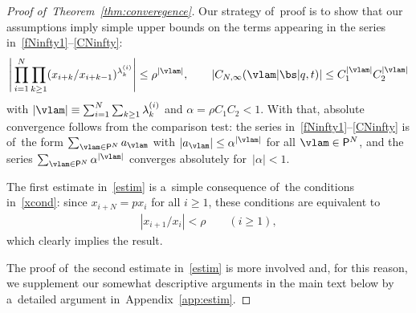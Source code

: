 \begin{proof}[Proof of~Theorem~\ref{thm:converegence}]
Our strategy of~proof is to show that our assumptions imply simple upper bounds on the terms appearing in the series in~\eqref{fNinfty1}--\eqref{CNinfty}:
\begin{gather}
\label{estim}
\Bigg|\prod_{i=1}^N\prod_{k\geq 1}(x_{i+k}/x_{i+k-1})^{\lambda^{(i)}_k}\Bigg|\leq \rho^{|\vlam|},\qquad \left|C_{N,\infty}(\vlam|\bs|q,t)\right|\leq C_1^{|\vlam|}C_2^{|\vlam|}
\end{gather}
with $|\vlam|\equiv \sum_{i=1}^N \sum_{k\geq 1}\lambda^{(i)}_k$ and $\alpha = \rho C_1C_2<1$.
With that, absolute convergence follows from the comparison test: the series in~\eqref{fNinfty1}--\eqref{CNinfty} is of~the form $\sum_{\vlam\in\mathsf{P}^N} a_{\vlam}$ with $|a_{\vlam}|\leq \alpha^{|\vlam|}$ for all $\vlam\in\mathsf{P}^N$,
and the series $\sum_{\vlam\in\mathsf{P}^N} \alpha^{|\vlam|}$ converges absolutely for~$|\alpha|<1$.

The first estimate in~\eqref{estim} is a~simple consequence of~the conditions in~\eqref{xcond}: since \allowbreak \mbox{$x_{i+N}=px_i$} for all $i\geq 1$, these conditions are equivalent to
\begin{gather*}
|x_{i+1}/x_i| < \rho\qquad (i\geq 1) ,
\end{gather*}
which clearly implies the result.

The proof of~the second estimate in~\eqref{estim} is more involved and, for this reason, we supplement our somewhat descriptive arguments in the main text below by a~detailed argument in~Appendix~\ref{app:estim}.


\end{proof}
